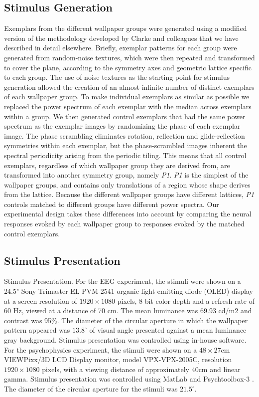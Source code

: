 \documentclass[9pt,twocolumn,twoside,lineno]{pnas-new}
\begin{document}
\subsection*{Stimulus Generation}
Exemplars from the different wallpaper groups were generated using a modified version of the methodology developed by Clarke and colleagues\cite{RN172} that we have described in detail elsewhere\cite{RN1725}. Briefly, exemplar patterns for each group were generated from random-noise textures, which were then repeated and transformed to cover the plane, according to the symmetry axes and geometric lattice specific to each group. The use of noise textures as the starting point for stimulus generation allowed the creation of an almost infinite number of distinct exemplars of each wallpaper group. To make individual exemplars as similar as possible we replaced the power spectrum of each exemplar with the median across exemplars within a group. We then generated control exemplars that had the same power spectrum as the exemplar images by randomizing the phase of each exemplar image. The phase scrambling eliminates rotation, reflection and glide-reflection symmetries within each exemplar, but the phase-scrambled images inherent the spectral periodicity arising from the periodic tiling. This means that all control exemplars, regardless of which wallpaper group they are derived from, are transformed into another symmetry group, namely \textit{P1}. \textit{P1} is the simplest of the wallpaper groups, and contains only translations of a region whose shape derives from the lattice. Because the different wallpaper groups have different lattices, \textit{P1} controls matched to different groups have different power spectra. Our experimental design takes these differences into account by comparing the neural responses evoked by each wallpaper group to responses evoked by the matched control exemplars.

\subsection*{Stimulus Presentation}
Stimulus Presentation. For the EEG experiment, the stimuli were shown on a 24.5" Sony Trimaster EL PVM-2541 organic light emitting diode (OLED) display at a screen resolution of $1920\times1080$ pixels, 8-bit color depth and a refresh rate of 60 Hz, viewed at a distance of 70 cm. The mean luminance was 69.93 cd/m2 and contrast was 95\%. The diameter of the circular aperture in which the wallpaper pattern appeared was $13.8^\circ$ of visual angle presented against a mean luminance gray background. Stimulus presentation was controlled using in-house software. For the psychophysics experiment, the stimuli were shown on a $48 \times 27$cm VIEWPixx/3D LCD Display monitor, model VPX-VPX-2005C, resolution $1920 \times 1080$ pixels, with a viewing distance of approximately 40cm and linear gamma. Stimulus presentation was controlled using MatLab and Psychtoolbox-3 \cite{kleiner2007,brainard1997spatial}. The diameter of the circular aperture for the stimuli was $21.5^\circ$.
\end{document}
